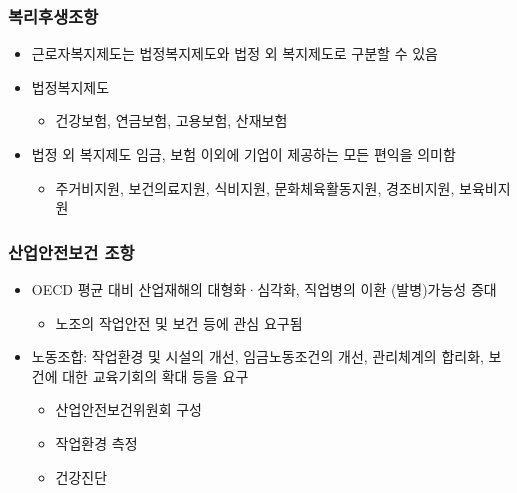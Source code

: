 \documentclass[aspectratio=169,xcolor=dvipsnames,handout]{beamer}
\begin{document}
\begin{frame}
    \frametitle{복리후생조항}
    \begin{itemize}[<+->]
        \item 근로자복지제도는 법정복지제도와 법정 외 복지제도로 구분할 수 있음
        \item 법정복지제도
        \begin{itemize}[<+->]
            \item 건강보험, 연금보험, 고용보험, 산재보험
        \end{itemize}
        \item 법정 외 복지제도 임금, 보험 이외에 기업이 제공하는 모든 편익을 의미함
            \begin{itemize}[<+->]
                \item 주거비지원, 보건의료지원, 식비지원, 문화체육활동지원, 경조비지원, 보육비지원
            \end{itemize}
        \end{itemize}
\end{frame}

\begin{frame}
    \frametitle{산업안전보건 조항}
    \begin{itemize}[<+->]
        \item OECD 평균 대비 산업재해의 대형화·심각화, 직업병의 이환 (발병)가능성 증대
        \begin{itemize}[<+->]
            \item 노조의 작업안전 및 보건 등에 관심 요구됨
        \end{itemize}
    \item 노동조합: 작업환경 및 시설의 개선, 임금노동조건의 개선, 관리체계의 합리화, 보건에 대한 교육기회의 확대 등을 요구
        \begin{itemize}[<+->]
            \item 산업안전보건위원회 구성
            \item 작업환경 측정
            \item 건강진단
        \end{itemize}
    \end{itemize}
\end{frame}
\end{document}
